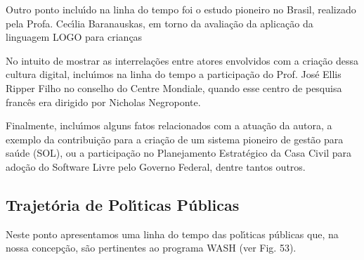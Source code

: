\documentclass[
12pt,		%
openright,	%
twoside,  %
a4paper,			%
chapter=TITLE,		%
english,			%
french,				%
spanish,			%
brazil				%
]{USPSC-classe/USPSC}
\begin{document}
Outro ponto inclu\'{\i}do na linha do tempo foi o estudo pioneiro no Brasil, realizado pela Profa. Cec\'{\i}lia Baranauskas, em torno da avalia\c{c}\~ao da aplica\c{c}\~ao da linguagem LOGO para crian\c{c}as









No intuito de mostrar as interrela\c{c}\~oes entre atores envolvidos com a cria\c{c}\~ao dessa \textquotedbl cultura digital\textquotedbl , inclu\'{\i}mos na linha do tempo a participa\c{c}\~ao do Prof. Jos\'e Ellis Ripper Filho no conselho do Centre Mondiale, quando esse centro de pesquisa franc\^es era dirigido por Nicholas Negroponte.









Finalmente, inclu\'{\i}mos alguns fatos relacionados com a atua\c{c}\~ao da autora, a exemplo da contribui\c{c}\~ao para a cria\c{c}\~ao de um sistema pioneiro de gest\~ao para sa\'ude (SOL), ou a participa\c{c}\~ao no Planejamento Estrat\'egico da Casa Civil para ado\c{c}\~ao do Software Livre pelo Governo Federal, dentre tantos outros.









\subsection[Trajet\'oria de Pol\'{\i}ticas P\'ublicas]{Trajet\'oria de Pol\'{\i}ticas P\'ublicas}\label{Trajet\'oria de Pol\'{\i}ticas P\'ublicas}
Neste ponto apresentamos uma linha do tempo das pol\'{\i}ticas p\'ublicas que, na nossa concep\c{c}\~ao, s\~ao pertinentes ao programa WASH (ver Fig. 53).
\end{document}
